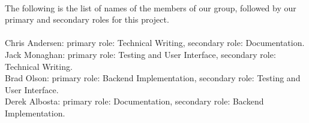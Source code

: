 \documentclass[12pt]{article}
\begin{document}
\\
The following is the list of names of the members of our group, followed by our primary and secondary roles for this project. \\
\\
Chris Andersen: primary role: Technical Writing, secondary role: Documentation.\\
Jack Monaghan: primary role: Testing and User Interface, secondary role: Technical Writing. \\
Brad Olson: primary role: Backend Implementation, secondary role: Testing and User Interface. \\
Derek Albosta: primary role: Documentation, secondary role: Backend Implementation. \\
\\
\end{document}
